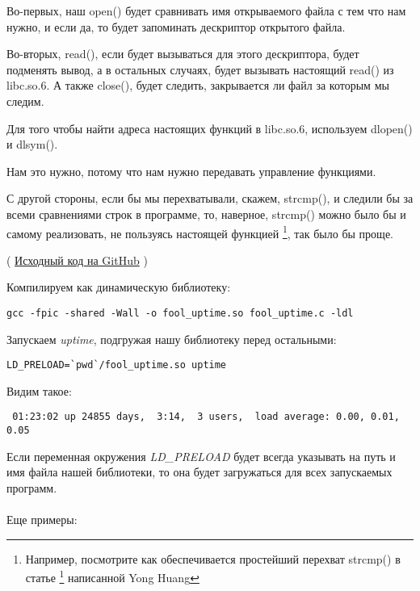 Во-первых, наш open() будет сравнивать имя открываемого файла с тем что нам нужно, и если да, 
то будет запоминать дескриптор открытого файла.

Во-вторых, read(), если будет вызываться для этого дескриптора, будет подменять вывод,
а в остальных случаях, будет вызывать настоящий read() из libc.so.6.
А также close(), будет следить, закрывается ли файл за которым мы следим.

Для того чтобы найти адреса настоящих функций в libc.so.6, используем dlopen() и dlsym().

Нам это нужно, потому что нам нужно передавать управление  функциями.

С другой стороны, если бы мы перехватывали, скажем, strcmp(), и следили бы за всеми сравнениями строк в программе, 
то, наверное, strcmp() можно было бы и самому реализовать, не пользуясь настоящей функцией
\footnote{Например, посмотрите как обеспечивается простейший перехват strcmp() в статье
\footnote{\href{http://go.yurichev.com/17143}{yurichev.com}} написанной Yong Huang}, так было бы проще.


( \href{https://github.com/DennisYurichev/RE-for-beginners/blob/master/OS/LD_PRELOAD/fool_uptime.c}{Исходный код на GitHub} )

Компилируем как динамическую библиотеку:

\begin{lstlisting}
gcc -fpic -shared -Wall -o fool_uptime.so fool_uptime.c -ldl
\end{lstlisting}

Запускаем \emph{uptime}, подгружая нашу библиотеку перед остальными:

\begin{lstlisting}
LD_PRELOAD=`pwd`/fool_uptime.so uptime
\end{lstlisting}

Видим такое:

\begin{lstlisting}
 01:23:02 up 24855 days,  3:14,  3 users,  load average: 0.00, 0.01, 0.05
\end{lstlisting}

Если переменная окружения \emph{LD\_PRELOAD} 
будет всегда указывать на путь и имя файла нашей библиотеки, то она будет
загружаться для всех запускаемых программ.  \\
\\
Еще примеры:

